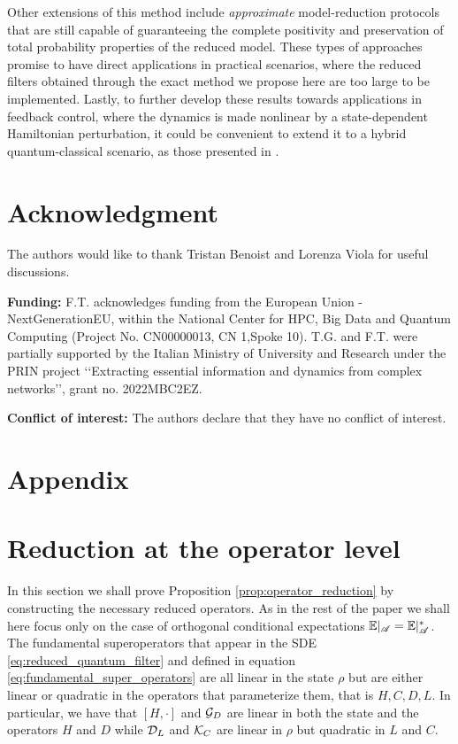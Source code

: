 \documentclass[aihp,12pt]{imsart}
\begin{document}
Other extensions of this method include {\em approximate} model-reduction protocols that are still capable of guaranteeing the complete positivity and preservation of total probability properties of the reduced model. These types of approaches promise to have direct applications in practical scenarios, where the reduced filters obtained through the exact method we propose here are too large to be implemented. Lastly, to further develop these results towards applications in feedback control, where the dynamics is made nonlinear by a state-dependent Hamiltonian perturbation, it could be convenient to extend it to a hybrid quantum-classical scenario, as those presented in \cite{barchielli2023markovian,barchielli2024hybridquantumclassicalsystemsquasifree}.

\section*{Acknowledgment}
The authors would like to thank Tristan Benoist and Lorenza Viola for useful discussions.

\noindent\textbf{Funding:}
F.T. acknowledges funding from the European Union - NextGenerationEU, within the National Center for HPC, Big Data and Quantum Computing (Project No. CN00000013, CN 1,Spoke 10).
T.G. and F.T. were partially supported by the Italian Ministry of University and Research under the PRIN project ‘‘Extracting essential information and dynamics from complex networks’’, grant  no. 2022MBC2EZ.

\noindent\textbf{Conflict of interest:} The authors declare that they have no conflict of interest. 

 


\section*{Appendix}
\appendix

\section{Reduction at the operator level}
\label{sec:noise_operators_reduction}

In this section we shall prove Proposition \ref{prop:operator_reduction} by constructing the necessary reduced operators. As in the rest of the paper we shall here focus only on the case of orthogonal conditional expectations $\mathbb{E}|_{\mathscr{A}} = \mathbb{E}|_{\mathscr{A}}^*$.
The fundamental superoperators that appear in the SDE \eqref{eq:reduced_quantum_filter} and defined in equation \eqref{eq:fundamental_super_operators} are all linear in the state $\rho$ but are either linear or quadratic in the operators that parameterize them, that is $H,C,D,L$. In particular, we have that $[H,\cdot]$ and $\mathcal{G}_{D}$ are linear in both the state and the operators $H$ and $D$ while $\mathcal{D}_{L}$ and $\mathcal{K}_{C}$ are linear in $\rho$ but quadratic in $L$ and $C$. 
\end{document}
